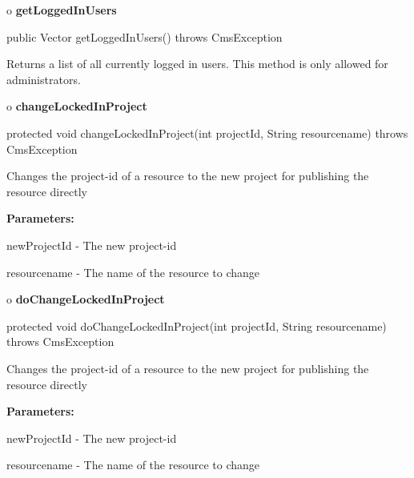 o {\bf getLoggedInUsers} 

\begin{PRE}
 public Vector getLoggedInUsers() throws CmsException
\end{PRE}

\begin{description}
\htmlDD Returns a list of all currently logged in users. This method is only
allowed for administrators. 

\end{description}

o {\bf changeLockedInProject} 

\begin{PRE}
 protected void changeLockedInProject(int projectId,
                                      String resourcename) throws CmsException
\end{PRE}

\begin{description}
\htmlDD Changes the project-id of a resource to the new project for publishing
the resource directly 

\begin{description}
\item {\bf Parameters:}  

newProjectId - The new project-id  

resourcename - The name of the resource to change  
\end{description}

\end{description}

o {\bf doChangeLockedInProject} 

\begin{PRE}
 protected void doChangeLockedInProject(int projectId,
                                        String resourcename) throws CmsException
\end{PRE}

\begin{description}
\htmlDD Changes the project-id of a resource to the new project for publishing
the resource directly 

\begin{description}
\item {\bf Parameters:}  

newProjectId - The new project-id  

resourcename - The name of the resource to change  
\end{description}

\end{description}

